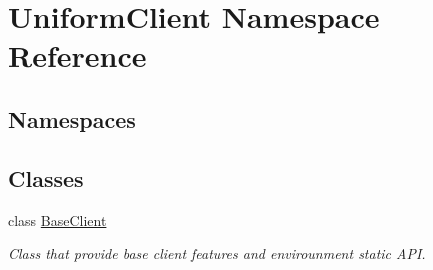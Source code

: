 \hypertarget{namespace_uniform_client}{}\section{Uniform\+Client Namespace Reference}
\label{namespace_uniform_client}
\subsection*{Namespaces}
\begin{DoxyCompactItemize}
\end{DoxyCompactItemize}
\subsection*{Classes}
\begin{DoxyCompactItemize}
\item 
class \mbox{\hyperlink{class_uniform_client_1_1_base_client}{Base\+Client}}
\begin{DoxyCompactList}\small\item\em Class that provide base client features and envirounment static A\+PI. \end{DoxyCompactList}\end{DoxyCompactItemize}
